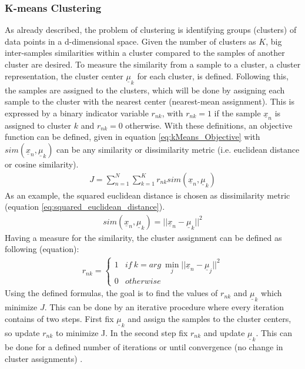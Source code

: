 \documentclass[12pt,DIV14,BCOR12mm,a4paper,footexclude,headinclude,halfparskip-,twoside,openright,cleardoubleempty,idxtotoc,bibtotoc,listtotoc,abstracton]{scrreprt} %
\numberwithin{equation}{chapter}
\begin{document}
\subsubsection{K-means Clustering}
As already described, the problem of clustering is identifying groups (clusters) of data points in a d-dimensional space. Given the number of clusters as $K$, big inter-samples similarities within a cluster compared to the samples of another cluster are desired. To measure the similarity from a sample to a cluster, a cluster representation, the cluster center $\underline{\mu}_{k}$ for each cluster, is defined. Following this, the samples are assigned to the clusters, which will be done by assigning each sample to the cluster with the nearest center (nearest-mean assignment). This is expressed by a binary indicator variable $r_{nk}$, with $r_{nk} = 1$ if the sample $\underline{x}_{n}$ is assigned to cluster $k$ and $r_{nk} = 0$ otherwise. With these definitions, an objective function can be defined, given in equation \ref{eq:kMeans_Objective} with $sim(\underline{x}_{n}, \underline{\mu}_{k})$ can be any similarity or dissimilarity metric (i.e. euclidean distance or cosine similarity).
\begin{align}
J = \sum_{n=1}^{N} \sum_{k=1}^{K} r_{nk} sim(\underline{x}_{n}, \underline{\mu}_{k})\label{eq:kMeans_Objective}
\end{align}
As an example, the squared euclidean distance is chosen as dissimilarity metric (equation \ref{eq:squared_euclidean_distance}).
\begin{align}
sim(\underline{x}_{n}, \underline{\mu}_{k}) = ||\underline{x}_{n} - \underline{\mu}_{k}||^{2}\label{eq:squared_euclidean_distance}
\end{align}
Having a measure for the similarity, the cluster assignment can be defined as following (equation):
\begin{align}
r_{nk} = \begin{cases} 1 & if\ k = arg\ \underset{j}\min ||\underline{x}_{n} - \underline{\mu}_{j}||^{2}\\0 & otherwise\end{cases}\label{eq:sample_clusterassignment}
\end{align}
Using the defined formulas, the goal is to find the values of $r_{nk}$ and $\underline{\mu}_{k}$ which minimize $J$. This can be done by an iterative procedure where every iteration contains of two steps. First fix $\underline{\mu}_{k}$ and assign the samples to the cluster centers, so update $r_{nk}$ to minimize J. In the second step fix $r_{nk}$ and update $\underline{\mu}_{k}$. This can be done for a defined number of iterations or until convergence (no change in cluster assignments) \cite{Bishop}.\\
\end{document}
